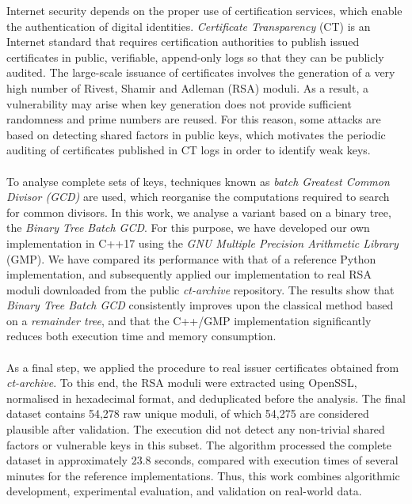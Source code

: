 Internet security depends on the proper use of certification services, which enable the authentication of digital identities. \textit{Certificate Transparency} (CT) is an Internet standard that requires certification authorities to publish issued certificates in public, verifiable, append-only logs so that they can be publicly audited. The large-scale issuance of certificates involves the generation of a very high number of Rivest, Shamir and Adleman (RSA) moduli. As a result, a vulnerability may arise when key generation does not provide sufficient randomness and prime numbers are reused. For this reason, some attacks are based on detecting shared factors in public keys, which motivates the periodic auditing of certificates published in CT logs in order to identify weak keys.
\\
\\
To analyse complete sets of keys, techniques known as \textit{batch Greatest Common Divisor (GCD)} are used, which reorganise the computations required to search for common divisors. In this work, we analyse a variant based on a binary tree, the \textit{Binary Tree Batch GCD}. For this purpose, we have developed our own implementation in C++17 using the \textit{GNU Multiple Precision Arithmetic Library} (GMP). We have compared its performance with that of a reference Python implementation, and subsequently applied our implementation to real RSA moduli downloaded from the public \textit{ct-archive} repository. The results show that \textit{Binary Tree Batch GCD} consistently improves upon the classical method based on a \textit{remainder tree}, and that the C++/GMP implementation significantly reduces both execution time and memory consumption.
\\
\\
As a final step, we applied the procedure to real issuer certificates obtained from \textit{ct-archive}. To this end, the RSA moduli were extracted using OpenSSL, normalised in hexadecimal format, and deduplicated before the analysis. The final dataset contains 54,278 raw unique moduli, of which 54,275 are considered plausible after validation. The execution did not detect any non-trivial shared factors or vulnerable keys in this subset. The algorithm processed the complete dataset in approximately 23.8 seconds, compared with execution times of several minutes for the reference implementations. Thus, this work combines algorithmic development, experimental evaluation, and validation on real-world data.
